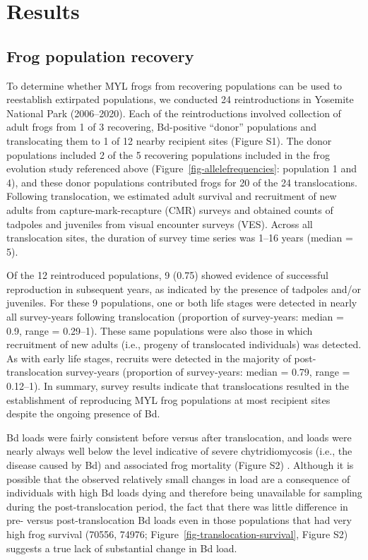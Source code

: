 \documentclass[9pt,twocolumn,twoside,lineno]{pnas-new}
\begin{document}
\section*{Results}

\subsection*{Frog population recovery}

To determine whether MYL frogs from recovering populations can be used
to reestablish extirpated populations, we conducted 24 reintroductions
in Yosemite National Park (2006--2020). Each of the reintroductions
involved collection of adult frogs from 1 of 3 recovering, Bd-positive
``donor'' populations and translocating them to 1 of 12 nearby recipient
sites (Figure S1). The donor populations included 2 of
the 5 recovering populations included in the frog evolution study
referenced above (Figure~\ref{fig-allelefrequencies}: population 1 and
4), and these donor populations contributed frogs for 20 of the 24
translocations. Following translocation, we estimated adult survival and
recruitment of new adults from capture-mark-recapture (CMR) surveys and
obtained counts of tadpoles and juveniles from visual encounter surveys
(VES). Across all translocation sites, the duration of survey time
series was 1--16 years (median = 5).

Of the 12 reintroduced populations, 9 (0.75) showed evidence of
successful reproduction in subsequent years, as indicated by the
presence of tadpoles and/or juveniles. For these 9 populations, one or
both life stages were detected in nearly all survey-years following
translocation (proportion of survey-years: median = 0.9, range =
0.29--1). These same populations were also those in which recruitment of
new adults (i.e., progeny of translocated individuals) was detected. As
with early life stages, recruits were detected in the majority of
post-translocation survey-years (proportion of survey-years: median =
0.79, range = 0.12--1). In summary, survey results indicate that
translocations resulted in the establishment of reproducing MYL frog
populations at most recipient sites despite the ongoing presence of Bd.

Bd loads were fairly consistent before versus after translocation, and
loads were nearly always well below the level indicative of severe
chytridiomycosis (i.e., the disease caused by Bd) and associated frog
mortality (Figure S2)
\citep{joseph2018, vredenburg2010}. Although it is possible that the
observed relatively small changes in load are a consequence of
individuals with high Bd loads dying and therefore being unavailable for
sampling during the post-translocation period, the fact that there was
little difference in pre- versus post-translocation Bd loads even in
those populations that had very high frog survival (70556, 74976;
Figure~\ref{fig-translocation-survival},
Figure S2) suggests a true lack of
substantial change in Bd load.
\end{document}
